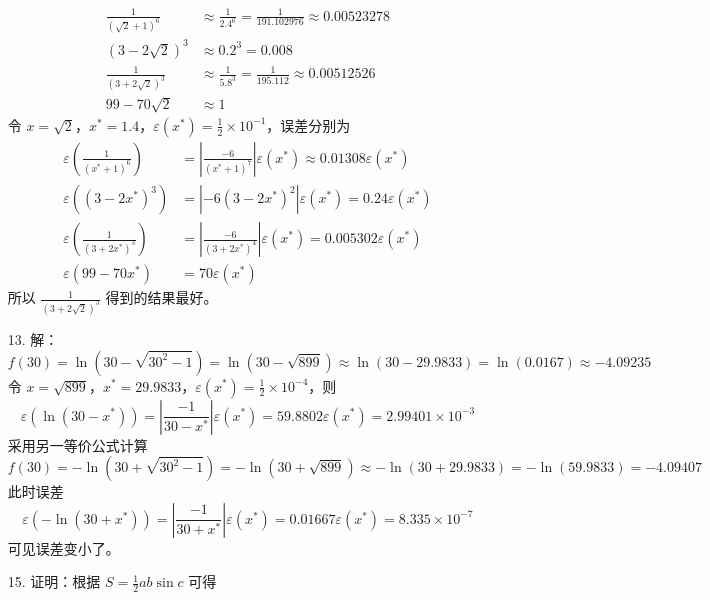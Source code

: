 \documentclass{sjtuarticle}
\begin{document}
\begin{itemize}
    \begin{align*}
        \frac{1}{(\sqrt{2}+1)^6}&\approx\frac{1}{2.4^6}=\frac{1}{191.102976}\approx 0.00523278\\
        (3-2\sqrt{2})^3&\approx 0.2^3=0.008\\
        \frac{1}{(3+2\sqrt{2})^3}&\approx\frac{1}{5.8^3}=\frac{1}{195.112}\approx 0.00512526\\
        99-70\sqrt{2}&\approx 1
    \end{align*}
    令 $x=\sqrt{2}$，$x^*=1.4$，$\varepsilon(x^*)=\frac{1}{2}\times 10^{-1}$，误差分别为
    \begin{align*}
        \varepsilon\left(\frac{1}{(x^*+1)^6}\right)&=\left|\frac{-6}{(x^*+1)^7}\right|\varepsilon(x^*)\approx 0.01308\varepsilon(x^*)\\
        \varepsilon\left((3-2x^*)^3\right)&=\left|-6(3-2x^*)^2\right|\varepsilon(x^*)=0.24\varepsilon(x^*)\\
        \varepsilon\left(\frac{1}{(3+2x^*)^3}\right)&=\left|\frac{-6}{(3+2x^*)^4}\right|\varepsilon(x^*)=0.005302\varepsilon(x^*)\\
        \varepsilon(99-70x^*)&=70\varepsilon(x^*)
    \end{align*}
    所以 $\frac{1}{(3+2\sqrt{2})^3}$ 得到的结果最好。
    \item[13.] 解：
    \begin{equation*}
        f(30)=\ln(30-\sqrt{30^2-1})=\ln(30-\sqrt{899})\approx\ln(30-29.9833)=\ln(0.0167)\approx -4.09235
    \end{equation*}
    令 $x=\sqrt{899}$，$x^*=29.9833$，$\varepsilon(x^*)=\frac{1}{2}\times 10^{-4}$，则
    \begin{equation*}
        \varepsilon(\ln(30-x^*))=\left|\frac{-1}{30-x^*}\right|\varepsilon(x^*)=59.8802\varepsilon(x^*)=2.99401\times 10^{-3}
    \end{equation*}
    采用另一等价公式计算
    \begin{equation*}
        f(30)=-\ln(30+\sqrt{30^2-1})=-\ln(30+\sqrt{899})\approx-\ln(30+29.9833)=-\ln(59.9833)=-4.09407
    \end{equation*}
    此时误差
    \begin{equation*}
        \varepsilon(-\ln(30+x^*))=\left|\frac{-1}{30+x^*}\right|\varepsilon(x^*)=0.01667\varepsilon(x^*)=8.335\times 10^{-7}
    \end{equation*}
    可见误差变小了。
    \item[15.] 证明：根据 $S=\frac{1}{2}ab\sin c$ 可得
    \begin{align*}

\end{align*}
\end{itemize}
\end{document}
